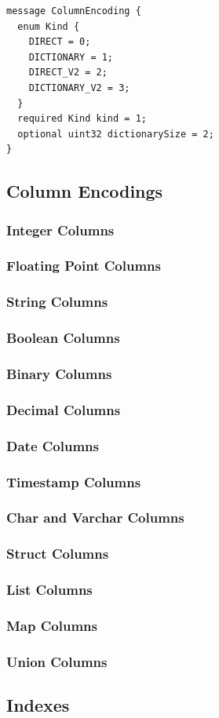 \documentclass{article}
\begin{document}
\begin{verbatim}
message ColumnEncoding {
  enum Kind {
    DIRECT = 0;
    DICTIONARY = 1;
    DIRECT_V2 = 2;
    DICTIONARY_V2 = 3;
  }
  required Kind kind = 1;
  optional uint32 dictionarySize = 2;
}
\end{verbatim}

\subsection{Column Encodings}

\subsubsection{Integer Columns}

\subsubsection{Floating Point Columns}

\subsubsection{String Columns}

\subsubsection{Boolean Columns}
\subsubsection{Binary Columns}

\subsubsection{Decimal Columns}

\subsubsection{Date Columns}

\subsubsection{Timestamp Columns}
\subsubsection{Char and Varchar Columns}

\subsubsection{Struct Columns}
\subsubsection{List Columns}
\subsubsection{Map Columns}
\subsubsection{Union Columns}

\subsection{Indexes}
\end{document}
